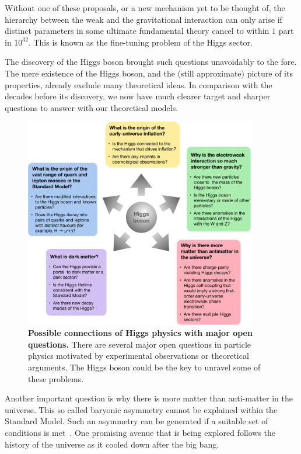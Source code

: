 \documentclass[12pt]{article}
\begin{document}
Without one of these proposals, or a new mechanism yet to be thought of, 
the hierarchy between the weak and the gravitational interaction can only arise if distinct parameters in some
ultimate fundamental theory cancel to within $1$ part in $10^{32}$. 
%
This is known as the fine-tuning problem of the Higgs sector.

The discovery of the Higgs boson brought such questions unavoidably to
the fore. The mere existence of the Higgs boson, and the (still approximate) picture of its properties, already exclude many theoretical ideas. In comparison with the decades before its discovery, we now have much clearer target and sharper questions to answer with our theoretical models.
%

\begin{figure}[htb]
  \centering
  \includegraphics[width=0.9\textwidth]{figs/Fig5-crop.pdf}  
    \caption{{\bf Possible connections of Higgs physics with major open questions.}
      There are several major open questions in particle physics motivated by experimental observations or theoretical arguments. The Higgs boson could be the key to unravel some of these problems.
 }
 \label{fig:HiggsNP}
\end{figure}



Another important question is why there is more matter than
anti-matter in the universe.
%
This so called baryonic asymmetry cannot be explained within the Standard
Model.
%
Such an asymmetry can be generated if a suitable set of conditions is
met~\cite{Sakharov:1967dj}.
%
One promising avenue that is being explored follows the history of the
universe as it cooled down after the big bang.
\end{document}
